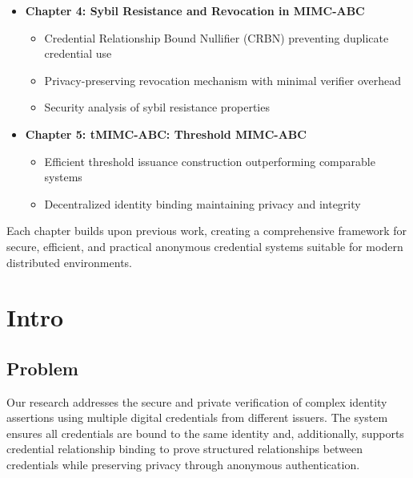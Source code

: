 \begin{itemize}
    \item \textbf{Chapter 4: Sybil Resistance and Revocation in MIMC-ABC}
    \begin{itemize}
        \item Credential Relationship Bound Nullifier (CRBN) preventing duplicate credential use
        \item Privacy-preserving revocation mechanism with minimal verifier overhead
        \item Security analysis of sybil resistance properties
    \end{itemize}

    \item \textbf{Chapter 5: tMIMC-ABC: Threshold MIMC-ABC}
    \begin{itemize}
        \item Efficient threshold issuance construction outperforming comparable systems
        \item Decentralized identity binding maintaining privacy and integrity
    \end{itemize}
\end{itemize}

Each chapter builds upon previous work, creating a comprehensive framework for secure, efficient, and practical anonymous credential systems suitable for modern distributed environments.

\section{Intro}
\subsection{Problem}
Our research addresses the secure and private verification of complex identity assertions using multiple digital credentials from different issuers. The system ensures all credentials are bound to the same identity and, additionally, supports credential relationship binding to prove structured relationships between credentials while preserving privacy through anonymous authentication.


